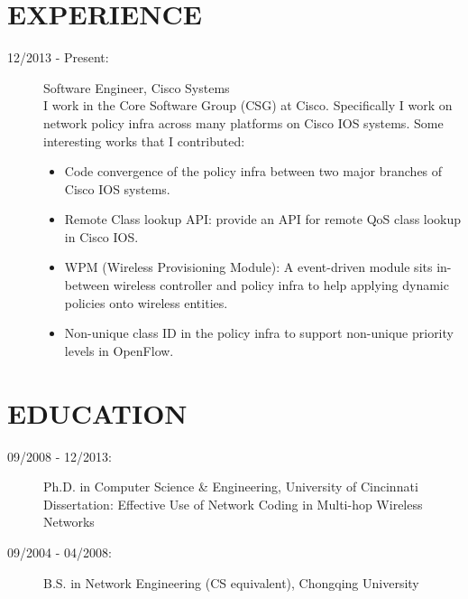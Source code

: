\documentclass[line]{res}
\begin{document}
\address{36681 Bishop St\\ Newark, CA 94560 \\ 513-679-0772}
\address{Email: \href{mailto:yang@yangchi.me}{yang@yangchi.me} \\ Github: \url{https://github.com/yangchi} }

\begin{resume}
	\section{EXPERIENCE}
	\begin{description}
		\item[12/2013 - Present:] Software Engineer, Cisco Systems \\
		I work in the Core Software Group (CSG) at Cisco. Specifically I work on network policy infra across many platforms on Cisco IOS systems. Some interesting works that I contributed:
        \begin{itemize}
            \item Code convergence of the policy infra between two major branches of Cisco IOS systems.
			\item Remote Class lookup API: provide an API for remote QoS class lookup in Cisco IOS.
            \item WPM (Wireless Provisioning Module): A event-driven module sits in-between wireless controller and policy infra to help applying dynamic policies onto wireless entities.
			\item Non-unique class ID in the policy infra to support non-unique priority levels in OpenFlow.
		\end{itemize}
	\end{description}
	\section{EDUCATION}
	\begin{description}
		\item[09/2008 - 12/2013:] Ph.D. in Computer Science \& Engineering, University of Cincinnati\\
			Dissertation: Effective Use of Network Coding in Multi-hop Wireless Networks
		\item[09/2004 - 04/2008:] B.S. in Network Engineering (CS equivalent), Chongqing University
	\end{description}
	

\end{resume}
\end{document}
